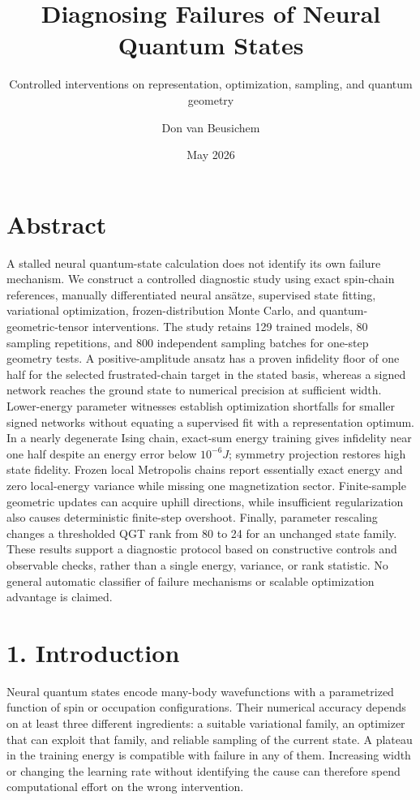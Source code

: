 \documentclass[
  11pt,
  a4paper,
]{article}
\title{Diagnosing Failures of Neural Quantum States}
\subtitle{Controlled interventions on representation, optimization,
sampling, and quantum geometry}
\author{Don van Beusichem}
\date{May 2026}
\begin{document}
\maketitle

{
\hypersetup{linkcolor=}
\setcounter{tocdepth}{3}
\tableofcontents
}
\hypertarget{abstract}{%
\section{Abstract}\label{abstract}}

A stalled neural quantum-state calculation does not identify its own
failure mechanism. We construct a controlled diagnostic study using
exact spin-chain references, manually differentiated neural ansätze,
supervised state fitting, variational optimization, frozen-distribution
Monte Carlo, and quantum-geometric-tensor interventions. The study
retains 129 trained models, 80 sampling repetitions, and 800 independent
sampling batches for one-step geometry tests. A positive-amplitude
ansatz has a proven infidelity floor of one half for the selected
frustrated-chain target in the stated basis, whereas a signed network
reaches the ground state to numerical precision at sufficient width.
Lower-energy parameter witnesses establish optimization shortfalls for
smaller signed networks without equating a supervised fit with a
representation optimum. In a nearly degenerate Ising chain, exact-sum
energy training gives infidelity near one half despite an energy error
below \(10^{-6}J\); symmetry projection restores high state fidelity.
Frozen local Metropolis chains report essentially exact energy and zero
local-energy variance while missing one magnetization sector.
Finite-sample geometric updates can acquire uphill directions, while
insufficient regularization also causes deterministic finite-step
overshoot. Finally, parameter rescaling changes a thresholded QGT rank
from 80 to 24 for an unchanged state family. These results support a
diagnostic protocol based on constructive controls and observable
checks, rather than a single energy, variance, or rank statistic. No
general automatic classifier of failure mechanisms or scalable
optimization advantage is claimed.

\hypertarget{introduction}{%
\section{1. Introduction}\label{introduction}}

Neural quantum states encode many-body wavefunctions with a parametrized
function of spin or occupation configurations. Their numerical accuracy
depends on at least three different ingredients: a suitable variational
family, an optimizer that can exploit that family, and reliable sampling
of the current state. A plateau in the training energy is compatible
with failure in any of them. Increasing width or changing the learning
rate without identifying the cause can therefore spend computational
effort on the wrong intervention.
\end{document}
